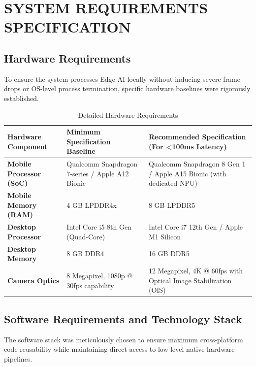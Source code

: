 \documentclass[12pt, a4paper]{report}
\begin{document}
\chapter{SYSTEM REQUIREMENTS SPECIFICATION}

\section{Hardware Requirements}
To ensure the system processes Edge AI locally without inducing severe frame drops or OS-level process termination, specific hardware baselines were rigorously established.

\begin{table}[H]
\centering
\caption{Detailed Hardware Requirements}
\renewcommand{\arraystretch}{1.5}
\begin{tabular}{|p{3.5cm}|p{5cm}|p{6cm}|}
\hline
\textbf{Hardware Component} & \textbf{Minimum Specification Baseline} & \textbf{Recommended Specification (For <100ms Latency)} \\ \hline
\textbf{Mobile Processor (SoC)} & Qualcomm Snapdragon 7-series / Apple A12 Bionic & Qualcomm Snapdragon 8 Gen 1 / Apple A15 Bionic (with dedicated NPU) \\ \hline
\textbf{Mobile Memory (RAM)} & 4 GB LPDDR4x & 8 GB LPDDR5 \\ \hline
\textbf{Desktop Processor} & Intel Core i5 8th Gen (Quad-Core) & Intel Core i7 12th Gen / Apple M1 Silicon \\ \hline
\textbf{Desktop Memory} & 8 GB DDR4 & 16 GB DDR5 \\ \hline
\textbf{Camera Optics} & 8 Megapixel, 1080p @ 30fps capability & 12 Megapixel, 4K @ 60fps with Optical Image Stabilization (OIS) \\ \hline
\end{tabular}
\end{table}

\section{Software Requirements and Technology Stack}
The software stack was meticulously chosen to ensure maximum cross-platform code reusability while maintaining direct access to low-level native hardware pipelines.
\end{document}
